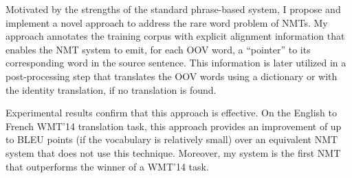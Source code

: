 Motivated by the strengths of the standard phrase-based system, I 
propose and implement a novel approach to address the rare word problem of NMTs.
My approach annotates the training corpus with 
explicit alignment information that enables the NMT system to emit, for each OOV word, a
``pointer'' to its corresponding word in the source sentence. This
information is later utilized in a post-processing step that translates
the OOV words using a dictionary or with the identity translation, if no translation is found.


Experimental results confirm that this approach is effective. On the English to French WMT'14
translation task, this approach provides an improvement of
up to \bestunkimp{} BLEU points (if the vocabulary is relatively small) 
over an equivalent NMT system that does not use this technique.
Moreover, my system is the first NMT that outperforms the winner of a WMT'14 task.


